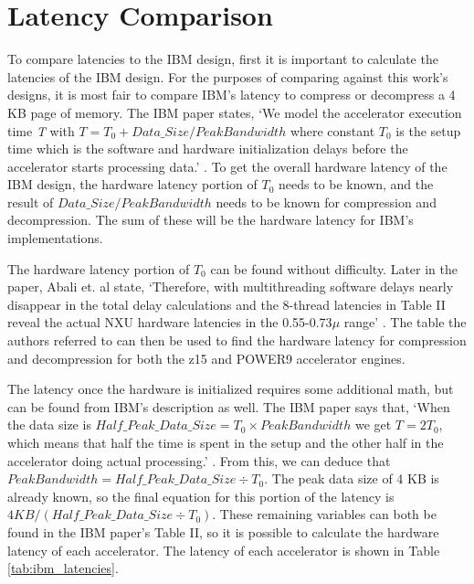 \documentclass[doublespace,nopageskip]{VTthesis}
\begin{document}
\section{Latency Comparison}\label{se:latency_comparison}
To compare latencies to the IBM design, first it is important to calculate the latencies of the IBM design. For the purposes of comparing against this work's designs, it is most fair to compare IBM's latency to compress or decompress a 4 KB page of memory. The IBM paper states, `We model the accelerator execution time \emph{T} with $T=T_{0}+Data\_Size/PeakBandwidth$ where constant \emph{$T_{0}$} is the setup time which is the software and hardware initialization delays before the accelerator starts processing data.' \cite{ibm}. To get the overall hardware latency of the IBM design, the hardware latency portion of \emph{$T_{0}$} needs to be known, and the result of $Data\_Size/PeakBandwidth$ needs to be known for compression and decompression. The sum of these will be the hardware latency for IBM's implementations.

The hardware latency portion of \emph{$T_{0}$} can be found without difficulty. Later in the paper, Abali et. al state, `Therefore, with multithreading software delays nearly disappear in the total delay calculations and the 8-thread latencies in Table II reveal the actual NXU hardware latencies in the 0.55-0.73\emph{$\mu$} range' \cite{ibm}. The table the authors referred to can then be used to find the hardware latency for compression and decompression for both the z15 and POWER9 accelerator engines.

The latency once the hardware is initialized requires some additional math, but can be found from IBM's description as well. The IBM paper says that, `When the data size is $Half\_Peak\_Data\_Size=T_{0} \times PeakBandwidth$ we get $T=2T_{0}$, which means that half the time is spent in the setup and the other half in the accelerator doing actual processing.' \cite{ibm}. From this, we can deduce that $PeakBandwidth=Half\_Peak\_Data\_Size \div T_{0}$. The peak data size of 4 KB is already known, so the final equation for this portion of the latency is $4KB/(Half\_Peak\_Data\_Size \div T_{0})$. These remaining variables can both be found in the IBM paper's Table II, so it is possible to calculate the hardware latency of each accelerator. The latency of each accelerator is shown in Table \ref{tab:ibm_latencies}.
\end{document}

